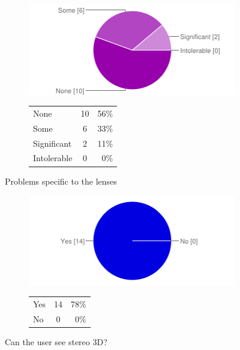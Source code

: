 \documentclass[MSc,paper=a4,pagesize=auto]{icldt}
\begin{document}
\begin{figure}[htbp!]
\centering
\begin{subfigure}{0.4\textwidth}
    \centering
    \includegraphics[width=1\linewidth]{resources/6-lens_problems}
\end{subfigure}%
\centering
\begin{subfigure}{\textwidth}
    \centering
   	\begin{tabular}{ l c r }
None&10&56\% \\
Some&6&33\% \\
Significant&2&11\% \\
Intolerable&0&0\% \\
\end{tabular}
\end{subfigure} 
    \caption{Problems specific to the lenses}
    \label{fig:6-lens_problems}
\end{figure}
\begin{figure}[htbp!]
\centering
\begin{subfigure}{0.4\textwidth}
    \centering
    \includegraphics[width=1\linewidth]{resources/7-can_see_3D}
\end{subfigure}%
\centering
\begin{subfigure}{\textwidth}
    \centering
   	\begin{tabular}{ l c r }
Yes&14&78\% \\
No&0&0\% \\
\end{tabular}
\end{subfigure} 
    \caption{Can the user see stereo 3D?}
    \label{fig:7-can_see_3D}
\end{figure}
\end{document}
